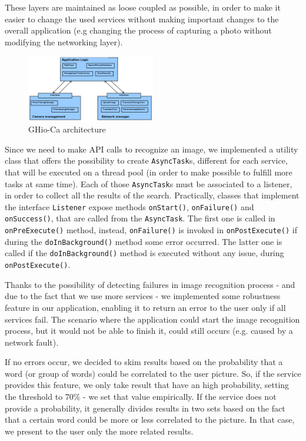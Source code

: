 These layers are maintained as loose coupled as possible, in order to make it
easier to change the used services without making important changes to the overall
application (e.g changing the process of capturing a photo without modifying the
networking layer).

\begin{figure}[h]
    \centering
    \includegraphics[width=0.50\textwidth]{../img/ghioca_macro_component}
    \caption{GHio-Ca architecture}
    \label{fig:architecture}
\end{figure}

Since we need to make API calls to recognize an image, we implemented a
utility class that offers the possibility to create \texttt{AsyncTask}s,
different for each service, that will be executed on a thread pool (in order to
make possible to fulfill more tasks at same time). Each of those
\texttt{AsyncTask}s must be associated to a listener, in order to collect all
the results of the search. Practically, classes that implement the interface
\texttt{Listener} expose methods \texttt{onStart()}, \texttt{onFailure()} and
\texttt{onSuccess()}, that are called from the \texttt{AsyncTask}. The first one
is called in \texttt{onPreExecute()} method, instead, \texttt{onFailure()} is 
invoked in \texttt{onPostExecute()} if during the \texttt{doInBackground()} 
method some error occurred. The latter one is called if the 
\texttt{doInBackground()} method is executed without any issue, during 
\texttt{onPostExecute()}.

Thanks to the possibility of detecting failures in image recognition process - and 
due to the fact that we use more services - we implemented some robustness feature 
in our application, enabling it to return an error to the user only if all services 
fail. The scenario where the application could start the image 
recognition process, but it would not be able to finish it, could still occurs 
(e.g. caused by a network fault).

If no errors occur, we decided to skim results based on the probability that a
word (or group of words) could be correlated to the user picture. So, if the
service provides this feature, we only take result that have an high
probability, setting the threshold to 70\% - we set that value empirically. If 
the service does not provide a probability, it generally divides results in two 
sets based on the fact that a certain word could be more or less correlated to 
the picture. In that case, we present to the user only the more related results.


